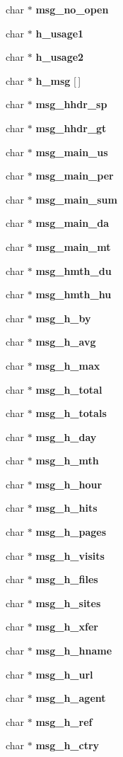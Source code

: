 \begin{CompactItemize}
char $\ast$ {\bf msg\_\-no\_\-open}
\item 
char $\ast$ {\bf h\_\-usage1}
\item 
char $\ast$ {\bf h\_\-usage2}
\item 
char $\ast$ {\bf h\_\-msg} [$\,$]
\item 
char $\ast$ {\bf msg\_\-hhdr\_\-sp}
\item 
char $\ast$ {\bf msg\_\-hhdr\_\-gt}
\item 
char $\ast$ {\bf msg\_\-main\_\-us}
\item 
char $\ast$ {\bf msg\_\-main\_\-per}
\item 
char $\ast$ {\bf msg\_\-main\_\-sum}
\item 
char $\ast$ {\bf msg\_\-main\_\-da}
\item 
char $\ast$ {\bf msg\_\-main\_\-mt}
\item 
char $\ast$ {\bf msg\_\-hmth\_\-du}
\item 
char $\ast$ {\bf msg\_\-hmth\_\-hu}
\item 
char $\ast$ {\bf msg\_\-h\_\-by}
\item 
char $\ast$ {\bf msg\_\-h\_\-avg}
\item 
char $\ast$ {\bf msg\_\-h\_\-max}
\item 
char $\ast$ {\bf msg\_\-h\_\-total}
\item 
char $\ast$ {\bf msg\_\-h\_\-totals}
\item 
char $\ast$ {\bf msg\_\-h\_\-day}
\item 
char $\ast$ {\bf msg\_\-h\_\-mth}
\item 
char $\ast$ {\bf msg\_\-h\_\-hour}
\item 
char $\ast$ {\bf msg\_\-h\_\-hits}
\item 
char $\ast$ {\bf msg\_\-h\_\-pages}
\item 
char $\ast$ {\bf msg\_\-h\_\-visits}
\item 
char $\ast$ {\bf msg\_\-h\_\-files}
\item 
char $\ast$ {\bf msg\_\-h\_\-sites}
\item 
char $\ast$ {\bf msg\_\-h\_\-xfer}
\item 
char $\ast$ {\bf msg\_\-h\_\-hname}
\item 
char $\ast$ {\bf msg\_\-h\_\-url}
\item 
char $\ast$ {\bf msg\_\-h\_\-agent}
\item 
char $\ast$ {\bf msg\_\-h\_\-ref}
\item 
char $\ast$ {\bf msg\_\-h\_\-ctry}
\item 

\end{CompactItemize}

